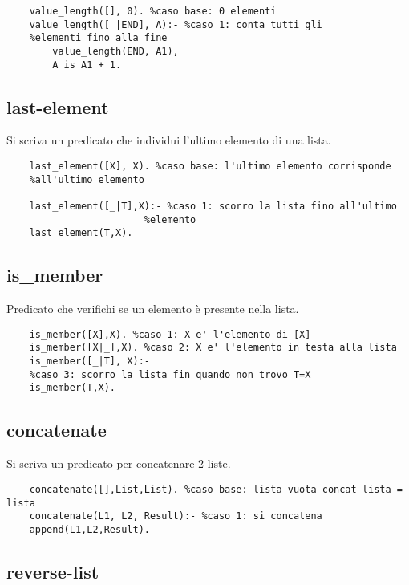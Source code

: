 \begin{lstlisting}
    value_length([], 0). %caso base: 0 elementi
    value_length([_|END], A):- %caso 1: conta tutti gli
    %elementi fino alla fine
        value_length(END, A1),
        A is A1 + 1.
\end{lstlisting}

\subsection{last-element}

Si scriva un predicato che individui l'ultimo elemento di una lista.

\begin{lstlisting}
    last_element([X], X). %caso base: l'ultimo elemento corrisponde 
    %all'ultimo elemento

    last_element([_|T],X):- %caso 1: scorro la lista fino all'ultimo
    					%elemento
    last_element(T,X).
\end{lstlisting}

\subsection{is_member}

Predicato che verifichi se un elemento è presente nella lista.

\begin{lstlisting}
    is_member([X],X). %caso 1: X e' l'elemento di [X]
    is_member([X|_],X). %caso 2: X e' l'elemento in testa alla lista
    is_member([_|T], X):- 
    %caso 3: scorro la lista fin quando non trovo T=X
    is_member(T,X).
\end{lstlisting}

\subsection{concatenate}

Si scriva un predicato per concatenare 2 liste.

\begin{lstlisting}
    concatenate([],List,List). %caso base: lista vuota concat lista = lista
    concatenate(L1, L2, Result):- %caso 1: si concatena
    append(L1,L2,Result).
\end{lstlisting}    

\subsection{reverse-list}

